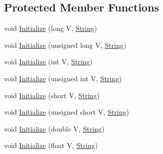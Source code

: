 \subsection*{Protected Member Functions}
\begin{DoxyCompactItemize}
\item 
void \hyperlink{class_canberra_1_1_utility_1_1_core_1_1_string_a1a01a4decb814a51f7d4d13dbb95fb49_a1a01a4decb814a51f7d4d13dbb95fb49}{Initialize} (long V, \hyperlink{class_canberra_1_1_utility_1_1_core_1_1_string}{String})
\item 
void \hyperlink{class_canberra_1_1_utility_1_1_core_1_1_string_aeceb9ed891eaff482a79c17b27af6078_aeceb9ed891eaff482a79c17b27af6078}{Initialize} (unsigned long V, \hyperlink{class_canberra_1_1_utility_1_1_core_1_1_string}{String})
\item 
void \hyperlink{class_canberra_1_1_utility_1_1_core_1_1_string_a207f877beda1ccde8f84a78273e086e0_a207f877beda1ccde8f84a78273e086e0}{Initialize} (int V, \hyperlink{class_canberra_1_1_utility_1_1_core_1_1_string}{String})
\item 
void \hyperlink{class_canberra_1_1_utility_1_1_core_1_1_string_ae24ba15e3ce5ca204bad161905a96fff_ae24ba15e3ce5ca204bad161905a96fff}{Initialize} (unsigned int V, \hyperlink{class_canberra_1_1_utility_1_1_core_1_1_string}{String})
\item 
void \hyperlink{class_canberra_1_1_utility_1_1_core_1_1_string_a9e86f71cbebfe3572fbd977d90132288_a9e86f71cbebfe3572fbd977d90132288}{Initialize} (short V, \hyperlink{class_canberra_1_1_utility_1_1_core_1_1_string}{String})
\item 
void \hyperlink{class_canberra_1_1_utility_1_1_core_1_1_string_a7333bb895a954eeb37b5db26d1e3ab38_a7333bb895a954eeb37b5db26d1e3ab38}{Initialize} (unsigned short V, \hyperlink{class_canberra_1_1_utility_1_1_core_1_1_string}{String})
\item 
void \hyperlink{class_canberra_1_1_utility_1_1_core_1_1_string_a0f57eb8d226bedb2922f2dad0cb0a607_a0f57eb8d226bedb2922f2dad0cb0a607}{Initialize} (double V, \hyperlink{class_canberra_1_1_utility_1_1_core_1_1_string}{String})
\item 
void \hyperlink{class_canberra_1_1_utility_1_1_core_1_1_string_ae974f29a017d0b7e7e337d48208efb02_ae974f29a017d0b7e7e337d48208efb02}{Initialize} (float V, \hyperlink{class_canberra_1_1_utility_1_1_core_1_1_string}{String})
\end{DoxyCompactItemize}
